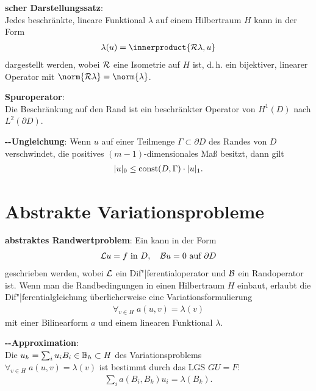 \linie

\textbf{scher Darstellungssatz}:\\
Jedes beschränkte, lineare Funktional $\lambda$ auf einem Hilbertraum $H$ kann in der Form
\begin{align*}
    \lambda(u) = \innerproduct{\R\lambda, u}
\end{align*}
dargestellt werden, wobei $\mathcal{R}$ eine Isometrie auf $H$ ist,
d.\,h. ein bijektiver, linearer Operator mit $\norm{\R\lambda} = \norm{\lambda}$.

\linie

\textbf{Spuroperator}:\\
Die Beschränkung auf den Rand ist ein beschränkter Operator von $H^1(D)$ nach $L^2(\partial D)$.

\linie

\textbf{--Ungleichung}:
Wenn $u$ auf einer Teilmenge $\Gamma \subset \partial D$ des Randes von $D$ verschwindet,
die positives $(m - 1)$-dimensionales Maß besitzt, dann gilt
\begin{align*}
    |u|_0 \le \operatorname{const}(D, \Gamma) \cdot |u|_1.
\end{align*}

\pagebreak

\section{%
    Abstrakte Variationsprobleme%
}

\textbf{abstraktes Randwertproblem}:
Ein  kann in der Form
\begin{align*}
    \mathcal{L} u = f \text{ in } D,\quad
    \mathcal{B} u = 0 \text{ auf } \partial D
\end{align*}
geschrieben werden, wobei $\mathcal{L}$ ein Dif"|ferentialoperator und $\mathcal{B}$ ein Randoperator ist.
Wenn man die Randbedingungen in einen Hilbertraum $H$ einbaut, erlaubt die Dif"|ferentialgleichung
überlicherweise eine Variationsformulierung
\begin{align*}
    \forall_{v \in H}\; a(u, v) = \lambda(v)
\end{align*}
mit einer Bilinearform $a$ und einem linearen Funktional $\lambda$.

\linie

\textbf{--Approximation}:\\
Die  $u_h = \sum_i u_i B_i \in \mathbb{B}_h \subset H$
des Variationsproblems\\
$\forall_{v \in H}\; a(u, v) = \lambda(v)$
ist bestimmt durch das LGS $GU = F$:
\begin{align*}
    \sum_i a(B_i, B_k) u_i = \lambda(B_k).
\end{align*}

